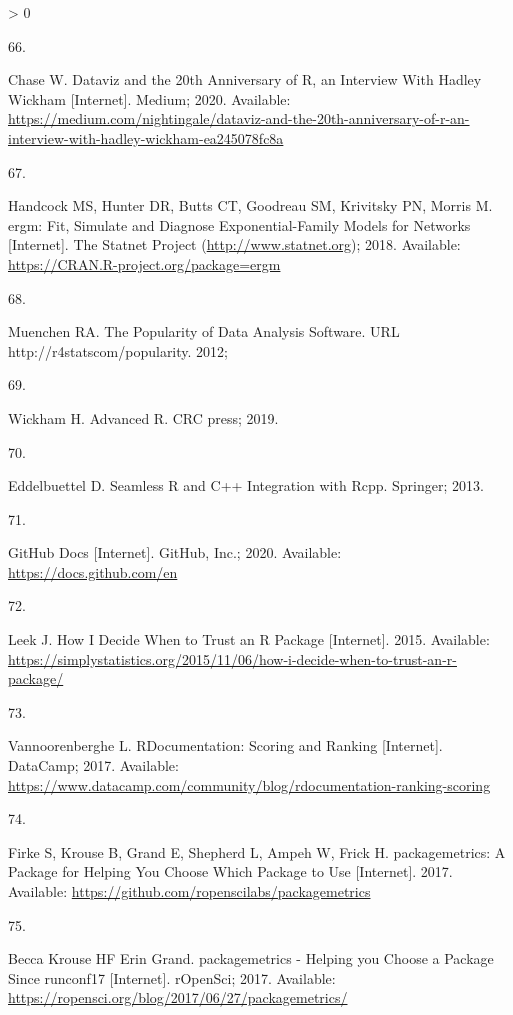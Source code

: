 \documentclass[10pt,letterpaper]{article}
\newlength{\csllabelwidth}
\newlength{\cslhangindent}
\newenvironment{CSLReferences}[3] %
 {%
  \setlength{\parindent}{0pt}
  \ifodd #1 \everypar{\setlength{\hangindent}{\cslhangindent}}\ignorespaces\fi
  \ifnum #2 > 0
  \setlength{\parskip}{#2\baselineskip}
  \fi
 }%
 {}
\newcommand{\CSLLeftMargin}[1]{\parbox[t]{\csllabelwidth}{#1}}
\newcommand{\CSLRightInline}[1]{\parbox[t]{\linewidth - \csllabelwidth}{#1}}
\begin{document}
\begin{CSLReferences}{0}{0}
\leavevmode\hypertarget{ref-chase2020}{}%
\CSLLeftMargin{66. }
\CSLRightInline{Chase W. {Dataviz and the 20th Anniversary of R, an
Interview With Hadley Wickham} {[}Internet{]}. Medium; 2020. Available:
\url{https://medium.com/nightingale/dataviz-and-the-20th-anniversary-of-r-an-interview-with-hadley-wickham-ea245078fc8a}}

\leavevmode\hypertarget{ref-statnet}{}%
\CSLLeftMargin{67. }
\CSLRightInline{Handcock MS, Hunter DR, Butts CT, Goodreau SM, Krivitsky
PN, Morris M. {ergm: Fit, Simulate and Diagnose Exponential-Family
Models for Networks} {[}Internet{]}. The Statnet Project
(\url{http://www.statnet.org}); 2018. Available:
\url{https://CRAN.R-project.org/package=ergm}}

\leavevmode\hypertarget{ref-muenchen2012}{}%
\CSLLeftMargin{68. }
\CSLRightInline{Muenchen RA. {The Popularity of Data Analysis Software}.
URL http://r4statscom/popularity. 2012; }

\leavevmode\hypertarget{ref-wickham2019}{}%
\CSLLeftMargin{69. }
\CSLRightInline{Wickham H. {Advanced R}. CRC press; 2019. }

\leavevmode\hypertarget{ref-eddelbuettel2013}{}%
\CSLLeftMargin{70. }
\CSLRightInline{Eddelbuettel D. {Seamless R and C++ Integration with
Rcpp}. Springer; 2013. }

\leavevmode\hypertarget{ref-githubdocs}{}%
\CSLLeftMargin{71. }
\CSLRightInline{{GitHub Docs} {[}Internet{]}. GitHub, Inc.; 2020.
Available: \url{https://docs.github.com/en}}

\leavevmode\hypertarget{ref-leek2015}{}%
\CSLLeftMargin{72. }
\CSLRightInline{Leek J. {How I Decide When to Trust an R Package}
{[}Internet{]}. 2015. Available:
\url{https://simplystatistics.org/2015/11/06/how-i-decide-when-to-trust-an-r-package/}}

\leavevmode\hypertarget{ref-vannoorenberghe2017}{}%
\CSLLeftMargin{73. }
\CSLRightInline{Vannoorenberghe L. {RDocumentation: Scoring and Ranking}
{[}Internet{]}. DataCamp; 2017. Available:
\url{https://www.datacamp.com/community/blog/rdocumentation-ranking-scoring}}

\leavevmode\hypertarget{ref-packagemetrics}{}%
\CSLLeftMargin{74. }
\CSLRightInline{Firke S, Krouse B, Grand E, Shepherd L, Ampeh W, Frick
H. {packagemetrics: A Package for Helping You Choose Which Package to
Use} {[}Internet{]}. 2017. Available:
\url{https://github.com/ropenscilabs/packagemetrics}}

\leavevmode\hypertarget{ref-packagemetricsblog}{}%
\CSLLeftMargin{75. }
\CSLRightInline{Becca Krouse HF Erin Grand. {packagemetrics - Helping
you Choose a Package Since runconf17} {[}Internet{]}. rOpenSci; 2017.
Available: \url{https://ropensci.org/blog/2017/06/27/packagemetrics/}}


\end{CSLReferences}
\end{document}
